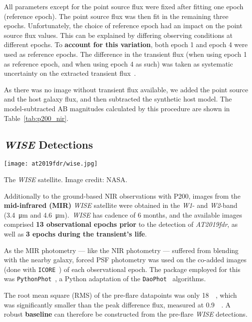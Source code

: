 All parameters except for the point source flux were fixed after fitting one epoch (reference epoch). The point source flux was then fit in the remaining three epochs. Unfortunately, the choice of reference epoch had an impact on the point source flux values. This can be explained by differing observing conditions at different epochs. To \textbf{account for this variation}, both epoch 1 and epoch 4 were used as reference epochs. The difference in the transient flux (when using epoch 1 as reference epoch, and when using epoch 4 as such) was taken as systematic uncertainty on the extracted transient flux~\cite{Reusch2022}.

As there was no image without transient flux available, we added the point source and the host galaxy flux, and then subtracted the synthetic host model. The model-subtracted AB magnitudes calculated by this procedure are shown in Table~\ref{tab:p200_nir}.

\subsection{\textit{WISE} Detections}

\begin{marginfigure}
    \texttt{[image: at2019fdr/wise.jpg]}
    \caption[The \textit{WISE} satellite]{The \textit{WISE} satellite. Image credit: NASA.}
\end{marginfigure}

Additionally to the ground-based NIR observations with P200, images from the \textbf{mid-infrared (MIR)} \textit{WISE} satellite were obtained in the \textit{W1}- and \textit{W2}-band (\SI{3.4}{\micro\m} and \SI{4.6}{\micro\m}).\ \textit{WISE} has cadence of 6 months, and the available images comprised \textbf{13 observational epochs prior} to the detection of \emph{AT2019fdr}, as well as \textbf{3 epochs during the transient's life}.

As the MIR photometry --- like the NIR photometry --- suffered from blending with the nearby galaxy, forced PSF photometry was used on the co-added images (done with \texttt{ICORE}~) of each observational epoch. The package employed for this was \texttt{PythonPhot}~, a Python adaptation of the \texttt{DaoPhot}~\cite{Stetson1987} algorithms.

The root mean square (RMS) of the pre-flare datapoints was only \SI{18}{\micro\jansky}, which was significantly smaller than the peak difference flux, measured at \SI{0.9}{\milli\jansky}. A robust \textbf{baseline} can therefore be constructed from the pre-flare \textit{WISE} detections.

